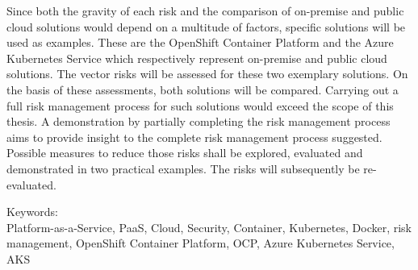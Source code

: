 Since both the gravity of each risk and the comparison of on-premise and public cloud solutions would depend on a multitude of factors, specific solutions will be used as examples. These are the OpenShift Container Platform and the Azure Kubernetes Service which respectively represent on-premise and public cloud solutions.
The vector risks will be assessed for these two exemplary solutions.
On the basis of these assessments, both solutions will be compared.
Carrying out a full risk management process for such solutions would exceed the scope of this thesis.
A demonstration by partially completing the risk management process aims to provide insight to the complete risk management process suggested.
Possible measures to reduce those risks shall be explored, evaluated and demonstrated in two practical examples.
The risks will subsequently be re-evaluated.

\bigskip

\noindent
Keywords: \\
Platform-as-a-Service, PaaS, Cloud, Security, Container, Kubernetes, Docker, risk management, OpenShift Container Platform, OCP, Azure Kubernetes Service, AKS

